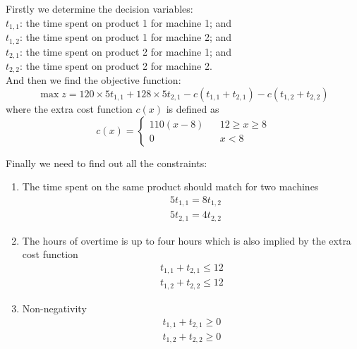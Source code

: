\documentclass{article}
\numberwithin{equation}{section}
\begin{document}
Firstly we determine the decision variables:\\
\indent $t_{1,1}$: the time spent on product 1 for machine 1; and\\
\indent $t_{1,2}$: the time spent on product 1 for machine 2; and\\
\indent $t_{2,1}$: the time spent on product 2 for machine 1; and\\
\indent $t_{2,2}$: the time spent on product 2 for machine 2. \\
And then we find the objective function:\\
\begin{equation}
	\max z=120\times 5 t_{1,1}+ 128 \times 5 t_{2,1}-c(t_{1,1}+t_{2,1})-c(t_{1,2}+t_{2,2})
\end{equation}
where the extra cost function $c(x)$ is defined as
\begin{equation*}
	c(x)=\left\{
	\begin{array}{rcl}
	110(x-8)&  &12\geqslant x\geqslant 8\\
	0&  &x<8
	\end{array}\right.
\end{equation*}

Finally we need to find out all the constraints:
\begin{enumerate}
\item The time spent on the same product should match for two machines\\
\begin{equation}
\begin{array}{ll}
	& 5t_{1,1}  =  8t_{1,2}\\
	& 5t_{2,1}  =  4t_{2,2}
\end{array}	
\end{equation}

\item The hours of overtime is up to four hours which is also implied by the extra cost function\\
\begin{equation}
	\begin{array}{ll}
	t_{1,1}+t_{2,1}\leqslant 12\\
	t_{1,2}+t_{2,2}\leqslant 12
	\end{array}
\end{equation}

\item Non-negativity\\
\begin{equation}
	\begin{array}{ll}
	t_{1,1}+t_{2,1}\geqslant 0\\
	t_{1,2}+t_{2,2}\geqslant 0
	\end{array}
\end{equation}
\end{enumerate}
\end{document}
